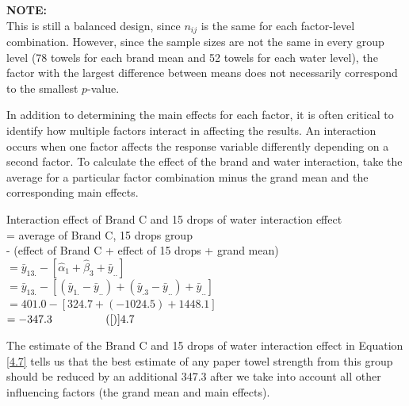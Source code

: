 \documentclass[
]{report}
\begin{document}
\large

\textbf{NOTE:}\\
This is still a balanced design, since \(n_{ij}\) is the same for each factor-level combination. However, since the sample sizes are not the same in every group level (78 towels for each brand mean and 52 towels for each water level), the factor with the largest difference between means does not necessarily correspond to the smallest \(p\)-value.
\normalsize

In addition to determining the main effects for each factor, it is often critical to identify how multiple factors interact in affecting the results. An interaction occurs when one factor affects the response variable differently depending on a second factor. To calculate the effect of the brand and water interaction, take the average for a particular factor combination minus the grand mean and the corresponding main effects.

Interaction effect of Brand C and 15 drops of water interaction effect\\
= average of Brand C, 15 drops group\\
- (effect of Brand C + effect of 15 drops + grand mean)\\
\(= \bar{y}_{13.} - [\hat{\alpha}_1 + \hat{\beta}_3 + \bar{y}_{..}]\)\\
\(= \bar{y}_{13.} - [(\bar{y}_{1.} - \bar{y}_{..}) + (\bar{y}_{.3} - \bar{y}_{..}) + \bar{y}_{..}]\)\\
\(= 401.0 - [324.7 + (-1024.5) + 1448.1]\)\\
\(= -347.3 \hspace{1cm} \tag\ref{4.7}\)

The estimate of the Brand C and 15 drops of water interaction effect in Equation \ref{4.7} tells us that the best estimate of any paper towel strength from this group should be reduced by an additional 347.3 after we take into account all other influencing factors (the grand mean and main effects).
\end{document}
